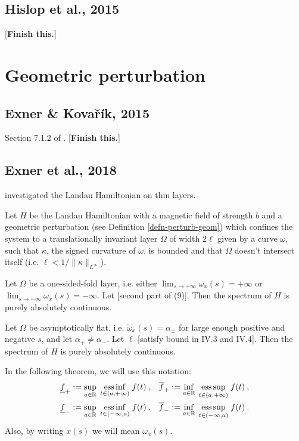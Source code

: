 \subsection{Hislop et al., 2015}
\cite{Hislop2015} [\textbf{Finish this.}]




\section{Geometric perturbation}

\subsection{Exner \& Kovařík, 2015}
Section 7.1.2 of \cite{ExnerKovarik2015}. [\textbf{Finish this.}]

\subsection{Exner et al., 2018}
\cite{Exner2018} investigated the Landau Hamiltonian on thin layers.

\begin{defn}
    Let $H\!$ be the Landau Hamiltonian with a magnetic field of strength $b$ and a geometric perturbation (see Definition \ref{defn-perturb-geom}) which confines the system to a translationally invariant layer $\Omega$ of width $2\ell$ given by a curve $\omega$, such that $\kappa$, the signed curvature of $\omega$, is bounded and that $\Omega$ doesn't intersect itself (i.e. $\ell < 1/\lVert\kappa\rVert_{L^\infty}$).
\end{defn}

\begin{thm}
    Let $\Omega$ be a one-sided-fold layer, i.e. either $\lim_{s \to {+\infty}} \omega_x(s) = +\infty$ or $\lim_{s \to {-\infty}} \omega_x(s) = -\infty$. Let [second part of (9)]. Then the spectrum of $H$ is purely absolutely continuous.
\end{thm}

\begin{thm}
    Let $\Omega$ be asymptotically flat, i.e. $\dot{\omega}_x(s) = \alpha_\pm$ for large enough positive and negative $s$, and let $\alpha_+ \neq \alpha_-$. Let $\ell$ [satisfy bound in IV.3 and IV.4]. Then the spectrum of $H$ is purely absolutely continuous.
\end{thm}

In the following theorem, we will use this notation:
\begin{align*}
    \underline{f}_+ &:= \sup_{a \in \mathbb{R}} \; \underset{t\in(a, +\infty)}{\operatorname{ess \, inf}} \; f(t) \: ,&
    \overline{f}_+ &:= \inf_{a \in \mathbb{R}} \; \underset{t\in(a, +\infty)}{\operatorname{ess \, sup}} \; f(t) \: ,\\
    \underline{f}_- &:= \sup_{a \in \mathbb{R}} \; \underset{t\in(-\infty, a)}{\operatorname{ess \, inf}} \; f(t) \: , &
    \overline{f}_- &:= \inf_{a \in \mathbb{R}} \; \underset{t\in(-\infty, a)}{\operatorname{ess \, sup}} \; f(t) \: .
\end{align*}
Also, by writing $x(s)$ we will mean $\omega_x(s)$.

